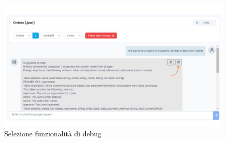 \begin{figure}[H]
  \centering
  \includegraphics[width=\textwidth]{assets/tasto_info_debug.png}
  \caption{Selezione funzionalità di debug}
\end{figure}

